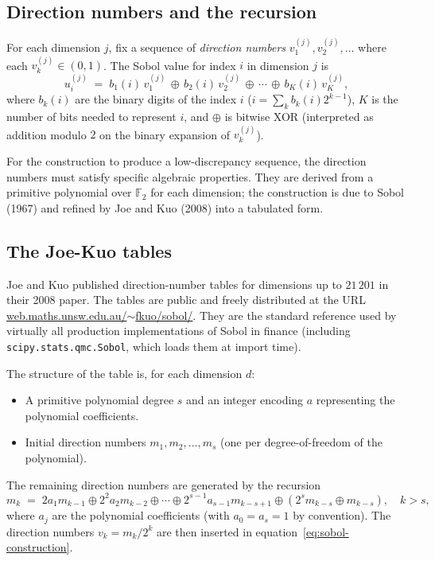\documentclass[11pt,a4paper]{article}
\theoremstyle{plain}
\theoremstyle{definition}
\theoremstyle{remark}
\begin{document}
\subsection{Direction numbers and the recursion}

For each dimension $j$, fix a sequence of \emph{direction numbers}
$v_1^{(j)}, v_2^{(j)}, \ldots$ where each $v_k^{(j)} \in (0, 1)$.
The Sobol value for index $i$ in dimension $j$ is
\begin{equation}
\label{eq:sobol-construction}
u_i^{(j)} \;=\; b_1(i) \, v_1^{(j)} \,\oplus\, b_2(i) \, v_2^{(j)}
\,\oplus\, \cdots \,\oplus\, b_K(i) \, v_K^{(j)},
\end{equation}
where $b_k(i)$ are the binary digits of the index $i$ ($i = \sum_k
b_k(i) 2^{k-1}$), $K$ is the number of bits needed to represent
$i$, and $\oplus$ is bitwise XOR (interpreted as addition modulo $2$
on the binary expansion of $v_k^{(j)}$).

For the construction to produce a low-discrepancy sequence, the
direction numbers must satisfy specific algebraic properties. They
are derived from a primitive polynomial over $\mathbb{F}_2$ for
each dimension; the construction is due to Sobol (1967) and refined
by Joe and Kuo (2008) into a tabulated form.

\subsection{The Joe-Kuo tables}

Joe and Kuo published direction-number tables for dimensions up to
$21\,201$ in their 2008 paper. The tables are public and freely
distributed at the URL
\href{https://web.maths.unsw.edu.au/~fkuo/sobol/}{web.maths.unsw.edu.au/$\sim$fkuo/sobol/}.
They are the standard reference used by virtually all production
implementations of Sobol in finance (including \texttt{scipy.stats.qmc.Sobol},
which loads them at import time).

The structure of the table is, for each dimension $d$:
\begin{itemize}
\item A primitive polynomial degree $s$ and an integer encoding $a$
representing the polynomial coefficients.
\item Initial direction numbers $m_1, m_2, \ldots, m_s$ (one per
degree-of-freedom of the polynomial).
\end{itemize}
The remaining direction numbers are generated by the recursion
\begin{equation}
m_k \;=\; 2 a_1 m_{k-1} \oplus 2^2 a_2 m_{k-2} \oplus \cdots \oplus
          2^{s-1} a_{s-1} m_{k-s+1} \oplus (2^s m_{k-s} \oplus
          m_{k-s}),
\quad k > s,
\end{equation}
where $a_j$ are the polynomial coefficients (with $a_0 = a_s = 1$
by convention). The direction numbers $v_k = m_k / 2^k$ are then
inserted in equation~\eqref{eq:sobol-construction}.
\end{document}
